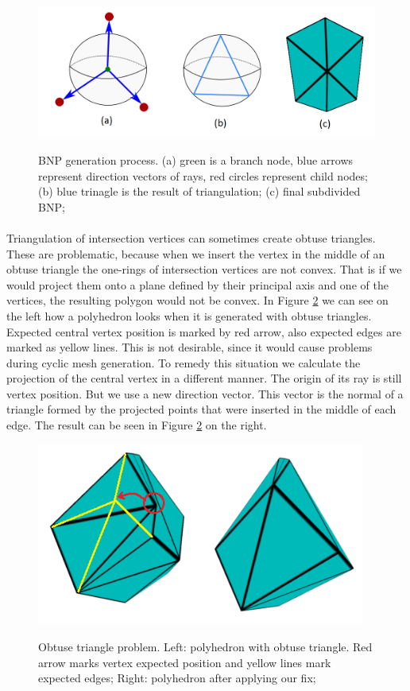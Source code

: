 \begin{figure}[h]
    \centering
    \includegraphics[width=\textwidth]{images/bnp_gen_ilu.png}
    \label{fig:bnp_gen_ilu}
    \caption[BNP generation process]{BNP generation process. (a) green is a branch node, blue arrows represent direction vectors of rays, red circles represent child nodes; (b) blue trinagle is the result of triangulation; (c) final subdivided BNP;}
\end{figure}

\paragraph{}
Triangulation of intersection vertices can sometimes create obtuse triangles. These are problematic, because when we insert the vertex in the middle of an obtuse triangle the one-rings of intersection vertices are not convex. That is if we would project them onto a plane defined by their principal axis and one of the vertices, the resulting polygon would not be convex. In Figure \ref{fig:obtus_tri_ilu} we can see on the left how a polyhedron looks when it is generated with obtuse triangles. Expected central vertex position is marked by red arrow, also expected edges are marked as yellow lines. This is not desirable, since it would cause problems during cyclic mesh generation. To remedy this situation we calculate the projection of the central vertex in a different manner. The origin of its ray is still vertex position. But we use a new direction vector. This vector is the normal of a triangle formed by the projected points that were inserted in the middle of each edge. The result can be seen in Figure \ref{fig:obtus_tri_ilu} on the right.

\begin{figure}[h]
    \centering
    \includegraphics[height=6cm]{images/obtuse_triangle_fix_ilu.png}
    \label{fig:obtus_tri_ilu}
    \caption[Obtuse triangle problem]{Obtuse triangle problem. Left: polyhedron with obtuse triangle. Red arrow marks vertex expected position and yellow lines mark expected edges; Right: polyhedron after applying our fix;}
\end{figure}

